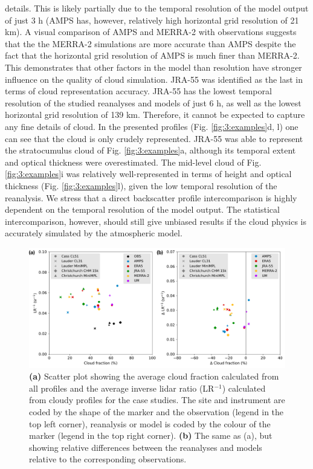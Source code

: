 details. This is likely partially due to the temporal resolution of the model output of just 3 h
(AMPS has, however, relatively high horizontal grid resolution of 21 km).
 A visual comparison of AMPS and MERRA-2 with observations suggests that the
the MERRA-2 simulations are more accurate than AMPS despite the
fact that the horizontal grid resolution of AMPS is much finer than MERRA-2.
This demonstrates that other factors in the model than resolution have
stronger influence on the quality of cloud simulation.
JRA-55
was identified as the last in terms of cloud representation accuracy. JRA-55
has the lowest temporal resolution of the studied reanalyses and models of
just 6 h, as well as the lowest horizontal grid resolution of 139 km. Therefore,
it cannot be expected to capture any fine details of cloud. In the presented
profiles (Fig. \ref{fig:3:examples}d, l) one can see that the cloud is only
crudely represented. JRA-55 was able to represent the stratocumulus cloud
of Fig. \ref{fig:3:examples}a, although its temporal extent and optical thickness
were overestimated. The mid-level cloud of Fig. \ref{fig:3:examples}i was
relatively well-represented in terms of height and optical thickness
(Fig. \ref{fig:3:examples}l), given the low temporal resolution of the reanalysis.
We stress that a direct backscatter profile intercomparison is highly dependent
on the temporal resolution of the model output. The statistical intercomparison,
however, should still give unbiased results if the cloud physics is accurately
simulated by the atmospheric model.

\begin{figure}[t]
\centering
\includegraphics[width=\textwidth]{chapter3/fig/scatter.pdf}
\caption[Scatter plot showing the average cloud fraction and the average inverse lidar ratio]{
\textbf{(a)} Scatter plot showing the average cloud fraction calculated from all profiles
and the average inverse lidar ratio (LR$^{-1}$) calculated from cloudy profiles
for the case studies. The site and instrument are coded by the shape of the
marker and the observation (legend in the top left corner), reanalysis or model
is coded by the colour of the marker (legend in the top right corner).
\textbf{(b)} The same as (a), but showing relative differences between
the reanalyses and models relative to the corresponding observations.
}
\label{fig:3:scatter}
\end{figure}

